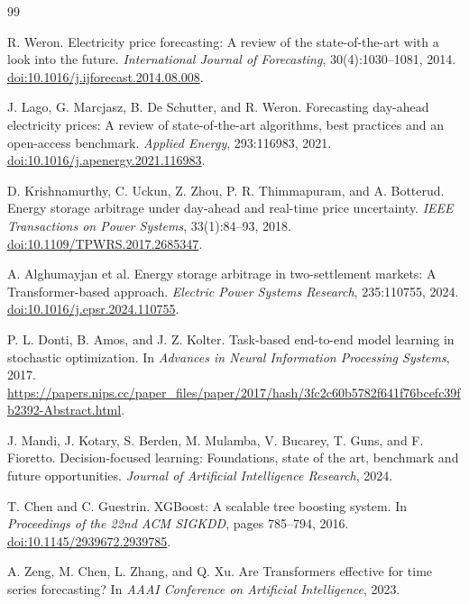 \documentclass[UTF8,a4paper,11pt,fontset=fandol]{ctexart}
\begin{document}
\begin{thebibliography}{99}
\small

R. Weron.
\newblock Electricity price forecasting: A review of the state-of-the-art with a look into the future.
\newblock \emph{International Journal of Forecasting}, 30(4):1030--1081, 2014.
\newblock \href{https://doi.org/10.1016/j.ijforecast.2014.08.008}{doi:10.1016/j.ijforecast.2014.08.008}.

J. Lago, G. Marcjasz, B. De Schutter, and R. Weron.
\newblock Forecasting day-ahead electricity prices: A review of state-of-the-art algorithms, best practices and an open-access benchmark.
\newblock \emph{Applied Energy}, 293:116983, 2021.
\newblock \href{https://doi.org/10.1016/j.apenergy.2021.116983}{doi:10.1016/j.apenergy.2021.116983}.

D. Krishnamurthy, C. Uckun, Z. Zhou, P. R. Thimmapuram, and A. Botterud.
\newblock Energy storage arbitrage under day-ahead and real-time price uncertainty.
\newblock \emph{IEEE Transactions on Power Systems}, 33(1):84--93, 2018.
\newblock \href{https://doi.org/10.1109/TPWRS.2017.2685347}{doi:10.1109/TPWRS.2017.2685347}.

A. Alghumayjan et al.
\newblock Energy storage arbitrage in two-settlement markets: A Transformer-based approach.
\newblock \emph{Electric Power Systems Research}, 235:110755, 2024.
\newblock \href{https://doi.org/10.1016/j.epsr.2024.110755}{doi:10.1016/j.epsr.2024.110755}.

P. L. Donti, B. Amos, and J. Z. Kolter.
\newblock Task-based end-to-end model learning in stochastic optimization.
\newblock In \emph{Advances in Neural Information Processing Systems}, 2017.
\newblock \url{https://papers.nips.cc/paper_files/paper/2017/hash/3fc2c60b5782f641f76bcefc39fb2392-Abstract.html}.

J. Mandi, J. Kotary, S. Berden, M. Mulamba, V. Bucarey, T. Guns, and F. Fioretto.
\newblock Decision-focused learning: Foundations, state of the art, benchmark and future opportunities.
\newblock \emph{Journal of Artificial Intelligence Research}, 2024.

T. Chen and C. Guestrin.
\newblock XGBoost: A scalable tree boosting system.
\newblock In \emph{Proceedings of the 22nd ACM SIGKDD}, pages 785--794, 2016.
\newblock \href{https://doi.org/10.1145/2939672.2939785}{doi:10.1145/2939672.2939785}.

A. Zeng, M. Chen, L. Zhang, and Q. Xu.
\newblock Are Transformers effective for time series forecasting?
\newblock In \emph{AAAI Conference on Artificial Intelligence}, 2023.


\end{thebibliography}
\end{document}
